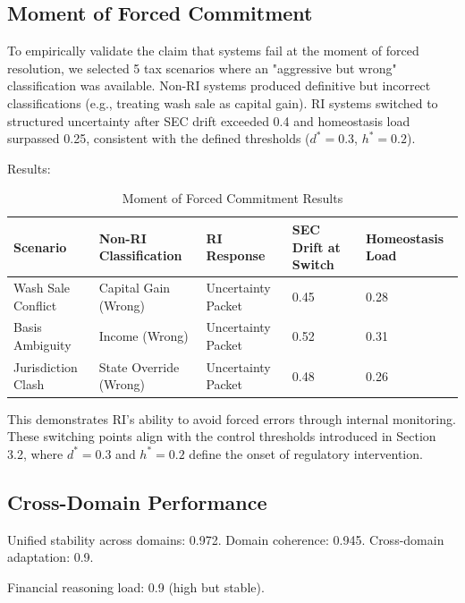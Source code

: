\documentclass[12pt,a4paper]{article}
\begin{document}
\subsection{Moment of Forced Commitment}

To empirically validate the claim that systems fail at the moment of forced resolution, we selected 5 tax scenarios where an "aggressive but wrong" classification was available. Non-RI systems produced definitive but incorrect classifications (e.g., treating wash sale as capital gain). RI systems switched to structured uncertainty after SEC drift exceeded 0.4 and homeostasis load surpassed 0.25, consistent with the defined thresholds ($d^* = 0.3$, $h^* = 0.2$).

Results:

\begin{table}[H]
\centering
\caption{Moment of Forced Commitment Results}
\label{tab:forced_commitment}

\begin{tabular}{@{}l
                p{3.0cm}
                p{2.6cm}
                p{2.4cm}
                p{2.4cm}@{}}
\toprule
\textbf{Scenario} &
\textbf{Non-RI Classification} &
\textbf{RI Response} &
\textbf{SEC Drift at Switch} &
\textbf{Homeostasis Load} \\
\midrule
Wash Sale Conflict   & Capital Gain (Wrong)   & Uncertainty Packet & 0.45 & 0.28 \\
Basis Ambiguity      & Income (Wrong)         & Uncertainty Packet & 0.52 & 0.31 \\
Jurisdiction Clash   & State Override (Wrong) & Uncertainty Packet & 0.48 & 0.26 \\
\bottomrule
\end{tabular}
\end{table}


This demonstrates RI's ability to avoid forced errors through internal monitoring. These switching points align with the control thresholds introduced in Section 3.2, where \(d^* = 0.3\) and \(h^* = 0.2\) define the onset of regulatory intervention.

\subsection{Cross-Domain Performance}

Unified stability across domains: 0.972. Domain coherence: 0.945. Cross-domain adaptation: 0.9.

Financial reasoning load: 0.9 (high but stable).
\end{document}
